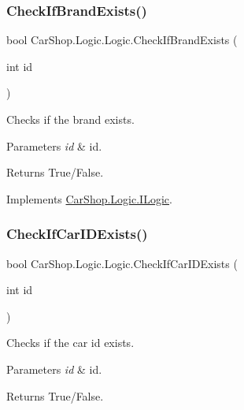 \subsubsection{\texorpdfstring{Check\+If\+Brand\+Exists()}{CheckIfBrandExists()}}
{\footnotesize\ttfamily bool Car\+Shop.\+Logic.\+Logic.\+Check\+If\+Brand\+Exists (\begin{DoxyParamCaption}\item[{int}]{id }\end{DoxyParamCaption})}



Checks if the brand exists. 


\begin{DoxyParams}{Parameters}
{\em id} & id.\\
\hline
\end{DoxyParams}
\begin{DoxyReturn}{Returns}
True/\+False.
\end{DoxyReturn}


Implements \mbox{\hyperlink{interface_car_shop_1_1_logic_1_1_i_logic_a5871000bbf6724abebf701f30113e488}{Car\+Shop.\+Logic.\+I\+Logic}}.

\mbox{\label{class_car_shop_1_1_logic_1_1_logic_aa1e3ab411c53e0498145f1f77cb33766}} 
\subsubsection{\texorpdfstring{Check\+If\+Car\+I\+D\+Exists()}{CheckIfCarIDExists()}}
{\footnotesize\ttfamily bool Car\+Shop.\+Logic.\+Logic.\+Check\+If\+Car\+I\+D\+Exists (\begin{DoxyParamCaption}\item[{int}]{id }\end{DoxyParamCaption})}



Checks if the car id exists. 


\begin{DoxyParams}{Parameters}
{\em id} & id.\\
\hline
\end{DoxyParams}
\begin{DoxyReturn}{Returns}
True/\+False.
\end{DoxyReturn}


